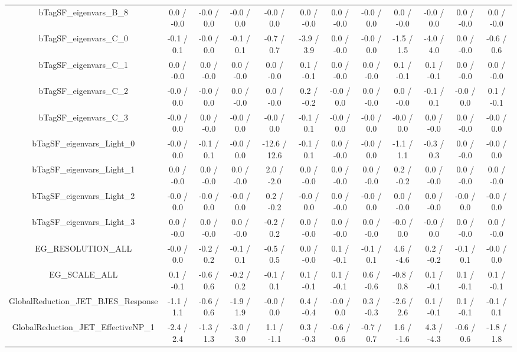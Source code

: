 \begin{table}[htbp]
\begin{center}
\begin{tabular}{|c|c|c|c|c|c|c|c|c|c|c|c|}
  bTagSF_eigenvars_B_8 & 0.0 / -0.0 & -0.0 / 0.0 & -0.0 / 0.0 & -0.0 / 0.0 & 0.0 / -0.0 & 0.0 / -0.0 & -0.0 / 0.0 & 0.0 / -0.0 & -0.0 / 0.0 & 0.0 / -0.0 & 0.0 / -0.0 \\ 
  bTagSF_eigenvars_C_0 & -0.1 / 0.1 & -0.0 / 0.0 & -0.1 / 0.1 & -0.7 / 0.7 & -3.9 / 3.9 & 0.0 / -0.0 & -0.0 / 0.0 & -1.5 / 1.5 & -4.0 / 4.0 & 0.0 / -0.0 & -0.6 / 0.6 \\ 
  bTagSF_eigenvars_C_1 & 0.0 / -0.0 & 0.0 / -0.0 & 0.0 / -0.0 & 0.0 / -0.0 & 0.1 / -0.1 & 0.0 / -0.0 & 0.0 / -0.0 & 0.1 / -0.1 & 0.1 / -0.1 & 0.0 / -0.0 & 0.0 / -0.0 \\ 
  bTagSF_eigenvars_C_2 & -0.0 / 0.0 & -0.0 / 0.0 & 0.0 / -0.0 & 0.0 / -0.0 & 0.2 / -0.2 & -0.0 / 0.0 & 0.0 / -0.0 & 0.0 / -0.0 & -0.1 / 0.1 & -0.0 / 0.0 & 0.1 / -0.1 \\ 
  bTagSF_eigenvars_C_3 & -0.0 / 0.0 & 0.0 / -0.0 & -0.0 / 0.0 & -0.0 / 0.0 & -0.1 / 0.1 & -0.0 / 0.0 & -0.0 / 0.0 & -0.0 / 0.0 & 0.0 / -0.0 & 0.0 / -0.0 & -0.0 / 0.0 \\ 
  bTagSF_eigenvars_Light_0 & -0.0 / 0.0 & -0.1 / 0.1 & -0.0 / 0.0 & -12.6 / 12.6 & -0.1 / 0.1 & 0.0 / -0.0 & -0.0 / 0.0 & -1.1 / 1.1 & -0.3 / 0.3 & 0.0 / -0.0 & -0.0 / 0.0 \\ 
  bTagSF_eigenvars_Light_1 & 0.0 / -0.0 & 0.0 / -0.0 & 0.0 / -0.0 & 2.0 / -2.0 & 0.0 / -0.0 & 0.0 / -0.0 & 0.0 / -0.0 & 0.2 / -0.2 & 0.0 / -0.0 & 0.0 / -0.0 & 0.0 / -0.0 \\ 
  bTagSF_eigenvars_Light_2 & -0.0 / 0.0 & -0.0 / 0.0 & -0.0 / 0.0 & 0.2 / -0.2 & -0.0 / 0.0 & 0.0 / -0.0 & -0.0 / 0.0 & 0.0 / -0.0 & 0.0 / -0.0 & -0.0 / 0.0 & -0.0 / 0.0 \\ 
  bTagSF_eigenvars_Light_3 & 0.0 / -0.0 & 0.0 / -0.0 & 0.0 / -0.0 & -0.2 / 0.2 & 0.0 / -0.0 & 0.0 / -0.0 & 0.0 / -0.0 & -0.0 / 0.0 & -0.0 / 0.0 & 0.0 / -0.0 & 0.0 / -0.0 \\ 
  EG_RESOLUTION_ALL & -0.0 / 0.0 & -0.2 / 0.2 & -0.1 / 0.1 & -0.5 / 0.5 & 0.0 / -0.0 & 0.1 / -0.1 & -0.1 / 0.1 & 4.6 / -4.6 & 0.2 / -0.2 & -0.1 / 0.1 & -0.0 / 0.0 \\ 
  EG_SCALE_ALL & 0.1 / -0.1 & -0.6 / 0.6 & -0.2 / 0.2 & -0.1 / 0.1 & 0.1 / -0.1 & 0.1 / -0.1 & 0.6 / -0.6 & -0.8 / 0.8 & 0.1 / -0.1 & 0.1 / -0.1 & 0.1 / -0.1 \\ 
  GlobalReduction_JET_BJES_Response & -1.1 / 1.1 & -0.6 / 0.6 & -1.9 / 1.9 & -0.0 / 0.0 & 0.4 / -0.4 & -0.0 / 0.0 & 0.3 / -0.3 & -2.6 / 2.6 & 0.1 / -0.1 & 0.1 / -0.1 & -0.1 / 0.1 \\ 
  GlobalReduction_JET_EffectiveNP_1 & -2.4 / 2.4 & -1.3 / 1.3 & -3.0 / 3.0 & 1.1 / -1.1 & 0.3 / -0.3 & -0.6 / 0.6 & -0.7 / 0.7 & 1.6 / -1.6 & 4.3 / -4.3 & -0.6 / 0.6 & -1.8 / 1.8 \\ 

\end{tabular}
\end{center}
\end{table}
